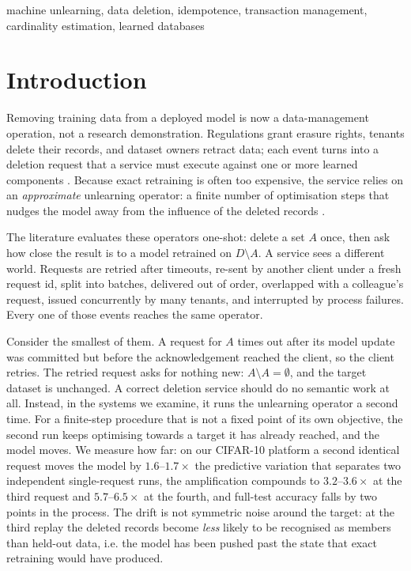 \documentclass[conference]{IEEEtran}
\begin{document}
\begin{IEEEkeywords}
machine unlearning, data deletion, idempotence, transaction management,
cardinality estimation, learned databases
\end{IEEEkeywords}

\section{Introduction}
\label{sec:intro}

Removing training data from a deployed model is now a data-management operation,
not a research demonstration.  Regulations grant erasure rights, tenants delete
their records, and dataset owners retract data; each event turns into a deletion
request that a service must execute against one or more learned components
\cite{cao2015towards,ginart2019making,bourtoule2021machine}.  Because exact
retraining is often too expensive, the service relies on an \emph{approximate}
unlearning operator: a finite number of optimisation steps that nudges the model
away from the influence of the deleted records
\cite{kurmanji2023unbounded,fan2024salun,foster2024fast}.

The literature evaluates these operators one-shot: delete a set $A$ once, then ask
how close the result is to a model retrained on $D\setminus A$.  A service sees a
different world.  Requests are retried after timeouts, re-sent by another client
under a fresh request id, split into batches, delivered out of order, overlapped
with a colleague's request, issued concurrently by many tenants, and interrupted by
process failures.  Every one of those events reaches the same operator.

Consider the smallest of them.  A request for $A$ times out after its model update
was committed but before the acknowledgement reached the client, so the client
retries.  The retried request asks for nothing new: $A\setminus A=\emptyset$, and
the target dataset is unchanged.  A correct deletion service should do no semantic
work at all.  Instead, in the systems we examine, it runs the unlearning operator a
second time.  For a finite-step procedure that is not a fixed point of its own
objective, the second run keeps optimising towards a target it has already reached,
and the model moves.  We measure how far: on our CIFAR-10 platform a second
identical request moves the model by $1.6$--$1.7\times$ the predictive variation
that separates two independent single-request runs, the amplification compounds to
$3.2$--$3.6\times$ at the third request and $5.7$--$6.5\times$ at the fourth, and
full-test accuracy falls by two points in the process.  The drift is not symmetric
noise around the target: at the third replay the deleted records become \emph{less}
likely to be recognised as members than held-out data, i.e. the model has been
pushed past the state that exact retraining would have produced.
\end{document}
